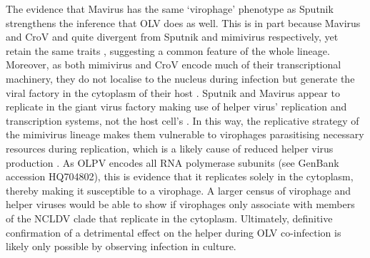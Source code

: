 The evidence that Mavirus has the same `virophage' phenotype as Sputnik strengthens the inference that \ac{OLV} does as well.
This is in part because Mavirus and \ac{CroV} and quite divergent from Sputnik and mimivirus respectively, yet retain the same traits \cite{Fischer2010, Fischer2011a}, suggesting a common feature of the whole lineage.
Moreover, as both mimivirus and \ac{CroV} encode much of their transcriptional machinery, they do not localise to the nucleus during infection but generate the viral factory in the cytoplasm of their host \cite{LaScola2008, Fischer2010}.
Sputnik and Mavirus appear to replicate in the giant virus factory making use of helper virus' replication and transcription systems, not the host cell's \cite{LaScola2008, Claverie2009, Fischer2011a}.
In this way, the replicative strategy of the mimivirus lineage makes them vulnerable to virophages parasitising necessary resources during replication, which is a likely cause of reduced helper virus production \cite{Claverie2009, Fischer2011a, Fischer2011b}.
As \ac{OLPV} encodes all \textsc{RNA} polymerase subunits (see GenBank accession HQ704802), this is evidence that it replicates solely in the cytoplasm, thereby making it susceptible to a virophage.
A larger census of virophage and helper viruses would be able to show if virophages only associate with members of the \ac{NCLDV} clade that replicate in the cytoplasm.
Ultimately, definitive confirmation of a detrimental effect on the helper during \ac{OLV} co-infection is likely only possible by observing infection in culture.

